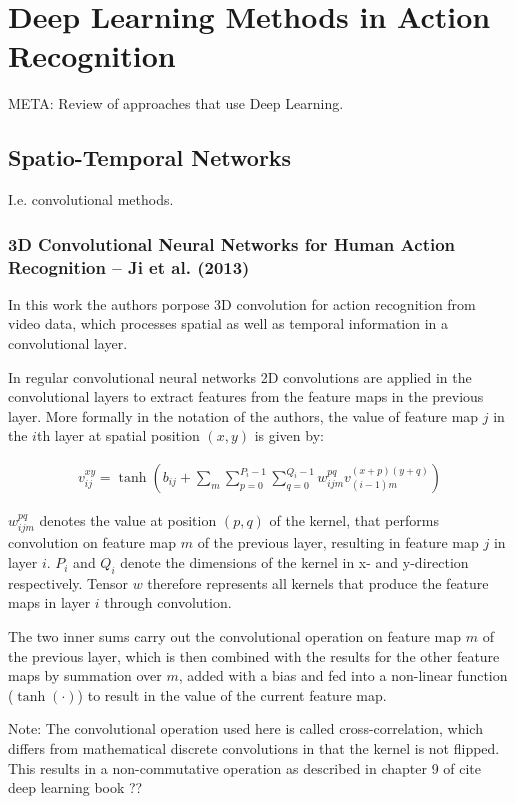 \section{Deep Learning Methods in Action Recognition}
META: Review of approaches that use Deep Learning.

\subsection{Spatio-Temporal Networks}
I.e. convolutional methods.

\subsubsection{3D Convolutional Neural Networks for Human Action Recognition -- Ji et al. (2013)}

In this work \cite{ji_3d_2013} the authors porpose 3D convolution for action recognition from video data, which processes spatial as well as temporal information in a convolutional layer.

In regular convolutional neural networks 2D convolutions are applied in the convolutional layers to extract features from the feature maps in the previous layer. More formally in the notation of the authors, the value of feature map $j$ in the $i$th layer at spatial position $(x,y)$ is given by:

\begin{align*}
    v_{ij}^{xy} = \tanh \left( b_{ij} + \sum_m \sum_{p=0}^{P_i -1} \sum_{q = 0}^{Q_i - 1} w_{ijm}^{pq} v_{(i-1)m}^{(x+p)(y+q)} \right)
\end{align*}

$w_{ijm}^{pq}$ denotes the value at position $(p,q)$ of the kernel, that performs convolution on feature map $m$ of the previous layer, resulting in feature map $j$ in layer $i$.
$P_i$ and $Q_i$ denote the dimensions of the kernel in x- and y-direction respectively.
Tensor $w$ therefore represents all kernels that produce the feature maps in layer $i$ through convolution.

The two inner sums carry out the convolutional operation on feature map $m$ of the previous layer, which is then combined with the results for the other feature maps by summation over $m$, added with a bias and fed into a non-linear function ($\tanh(\cdot)$) to result in the value of the current feature map.

Note: The convolutional operation used here is called cross-correlation, which differs from mathematical discrete convolutions in that the kernel is not flipped. This results in a non-commutative operation as described in chapter 9 of cite deep learning book ??

